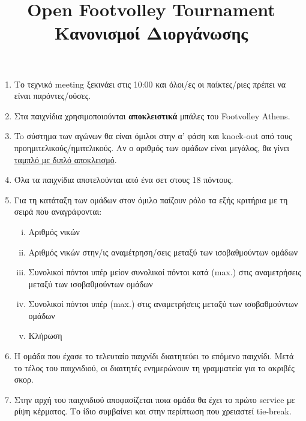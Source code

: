 \documentclass[a4paper,11pt]{article}
\title{Open Footvolley Tournament \\ Κανονισμοί Διοργάνωσης}
\date{}
\begin{document}
\maketitle
\thispagestyle{fancy}

\vspace{-2cm}

\begin{enumerate}

\item Το τεχνικό meeting ξεκινάει στις 10:00 και όλοι/ες οι παίκτες/ριες πρέπει
  να είναι παρόντες/ούσες.

\item Στα παιχνίδια χρησιμοποιούνται \textbf{αποκλειστικά} μπάλες του Footvolley
  Athens.

\item To σύστημα των αγώνων θα είναι όμιλοι στην α' φάση και knock-out από τους
  προημιτελικούς/ημιτελικούς. Aν ο αριθμός των ομάδων είναι μεγάλος, θα γίνει
  \href{https://www.printyourbrackets.com/9teamdoubleelimination.html}{ταμπλό με
    διπλό αποκλεισμό}.

\item Όλα τα παιχνίδια αποτελούνται από ένα σετ στους 18 πόντους.

\item Για τη κατάταξη των ομάδων στον όμιλο παίζουν ρόλο τα εξής κριτήρια με τη
  σειρά που αναγράφονται:

  \begin{enumerate}[i)]
  \item Αριθμός νικών
  \item Αριθμός νικών στην/ις αναμέτρηση/σεις μεταξύ των ισοβαθμούντων ομάδων
  \item Συνολικοί πόντοι υπέρ μείον συνολικοί πόντοι κατά (max.) στις
    αναμετρήσεις μεταξύ των ισοβαθμούντων ομάδων
  \item Συνολικοί πόντοι υπέρ (max.) στις αναμετρήσεις μεταξύ των ισοβαθμούντων
    ομάδων
  \item Κλήρωση %
  \end{enumerate}

\item Η ομάδα που έχασε το τελευταίο παιχνίδι διαιτητεύει το επόμενο παιχνίδι.
  Μετά το τέλος του παιχνιδιού, οι διαιτητές ενημερώνουν τη γραμματεία για το
  ακριβές σκορ.

\item Στην αρχή του παιχνιδιού αποφασίζεται ποια ομάδα θα έχει το πρώτο service
  με ρίψη κέρματος. Το ίδιο συμβαίνει και στην περίπτωση που χρειαστεί
  tie-break.


\end{enumerate}
\end{document}
